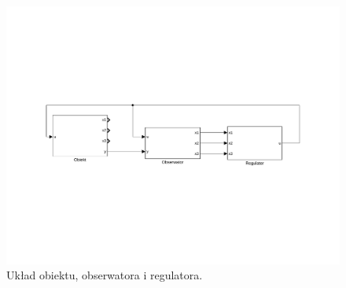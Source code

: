 \begin{figure}[H]
\centering
 \includegraphics[width=\textwidth]{img/objobsreg.pdf}
\caption{Układ obiektu, obserwatora i regulatora.}
\end{figure}